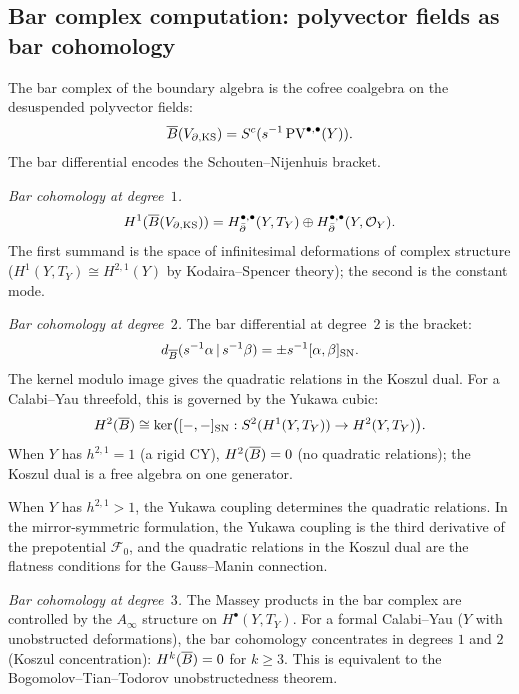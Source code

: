 \subsection{Bar complex computation: polyvector fields as bar
cohomology}

\begin{computation}
The bar complex of the boundary algebra is the cofree coalgebra
on the desuspended polyvector fields:
\[
\overline{B}(V_{\partial,\mathrm{KS}})
= S^c(s^{-1}\operatorname{PV}^{\bullet,\bullet}(Y)).
\]
The bar differential encodes the Schouten--Nijenhuis bracket.

\emph{Bar cohomology at degree~$1$.}
\[
H^1(\overline{B}(V_{\partial,\mathrm{KS}}))
= H^{\bullet,\bullet}_{\bar\partial}(Y,T_Y)
\oplus H^{\bullet,\bullet}_{\bar\partial}(Y,\mathcal O_Y).
\]
The first summand is the space of infinitesimal deformations
of complex structure ($H^1(Y,T_Y)\cong H^{2,1}(Y)$ by
Kodaira--Spencer theory); the second is the constant mode.

\emph{Bar cohomology at degree~$2$.}
The bar differential at degree~$2$ is the bracket:
\[
d_{\overline{B}}(s^{-1}\alpha\,|\,s^{-1}\beta)
= \pm s^{-1}[\alpha,\beta]_{\mathrm{SN}}.
\]
The kernel modulo image gives the quadratic relations in
the Koszul dual. For a Calabi--Yau threefold, this is
governed by the Yukawa cubic:
\begin{equation}%
H^2(\barB)
\cong \ker\bigl(
[-,-]_{\sn}: S^2(H^1(Y,T_Y))\to H^2(Y,T_Y)
\bigr).
\end{equation}
When $Y$ has $h^{2,1}=1$ (a rigid CY), $H^2(\overline{B})=0$
(no quadratic relations); the Koszul dual is a free algebra
on one generator.

When $Y$ has $h^{2,1}>1$, the Yukawa coupling determines
the quadratic relations. In the mirror-symmetric
formulation, the Yukawa coupling is the third derivative
of the prepotential $\mathcal{F}_0$, and the quadratic
relations in the Koszul dual are the flatness conditions
for the Gauss--Manin connection.

\emph{Bar cohomology at degree~$3$.}
The Massey products in the bar complex are controlled by
the $A_\infty$ structure on $H^\bullet(Y,T_Y)$. For a
formal Calabi--Yau ($Y$ with unobstructed deformations),
the bar cohomology concentrates in degrees $1$ and $2$
(Koszul concentration): $H^k(\overline{B})=0$ for $k\ge 3$.
This is equivalent to the Bogomolov--Tian--Todorov
unobstructedness theorem.
\end{computation}

